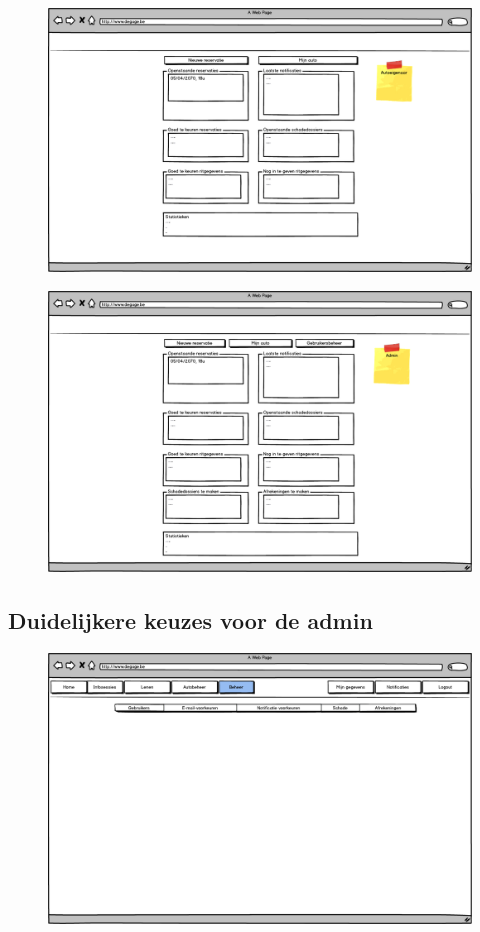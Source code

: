 \documentclass[11pt,a4paper,oneside]{article}
\begin{document}
\begin{figure}[H]\includegraphics[width=\textwidth]{../../mockups/dashboard_carowner.png}\end{figure}
\begin{figure}[H]\includegraphics[width=\textwidth]{../../mockups/dashboard_admin.png}\end{figure}

\subsection{Duidelijkere keuzes voor de admin}
\begin{figure}[H]\includegraphics[width=\textwidth]{../../mockups/admin_menu.png}\end{figure}
\end{document}
